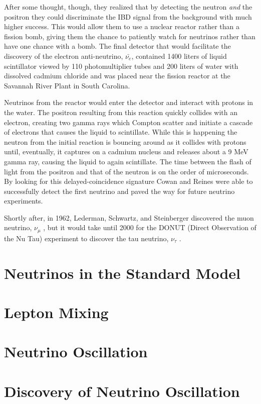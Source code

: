 After some thought, though, they realized that by detecting the neutron \textit{and} the positron they could discriminate the IBD signal from the background with much higher success. This would allow them to use a nuclear reactor rather than a fission bomb, giving them the chance to patiently watch for neutrinos rather than have one chance with a bomb. 
The final detector that would facilitate the discovery of the electron anti-neutrino, $\bar{\nu_{e}}$, contained 1400 liters of liquid scintillator viewed by 110 photomultiplier tubes and 200 liters of water with dissolved cadmium chloride and was placed near the fission reactor at the Savannah River Plant in South Carolina. 

Neutrinos from the reactor would enter the detector and interact with protons in the water. The positron resulting from this reaction quickly collides with an electron, creating two gamma rays which Compton scatter and initiate a cascade of electrons that causes the liquid to scintillate. 
While this is happening the neutron from the initial reaction is bouncing around as it collides with protons until, eventually, it captures on a cadmium nucleus and releases about a 9 MeV gamma ray, causing the liquid to again scintillate. 
The time between the flash of light from the positron and that of the neutron is on the order of microseconds. 
By looking for this delayed-coincidence signature Cowan and Reines were able to successfully detect the first neutrino and paved the way for future neutrino experiments. 

Shortly after, in 1962, Lederman, Schwartz, and Steinberger discovered the muon neutrino, $\nu_{\mu}$ \cite{Lederman}, but it would take until 2000 for the DONUT (Direct Observation of the Nu Tau) experiment to discover the tau neutrino, $\nu_{\tau}$ \cite{TauDONUT,DONUT}.


\section{Neutrinos in the Standard Model} 

\section{Lepton Mixing}

\section{Neutrino Oscillation}

\section{Discovery of Neutrino Oscillation}






